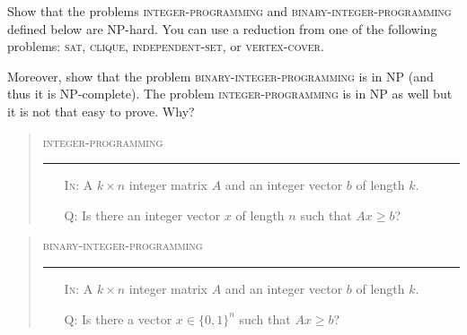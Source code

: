 \documentclass[a4paper,12pt]{amsart}
\begin{document}
        
        \medskip\begin{problem}
        Show that the problems \textsc{integer-programming} and \textsc{binary-integer-programming} defined below are NP-hard. You can use a reduction from one of the following problems: \textsc{sat}, \textsc{clique}, \textsc{independent-set}, or \textsc{vertex-cover}.
        
        Moreover, show that the problem \textsc{binary-integer-programming} is in NP (and thus it is NP-complete). The problem \textsc{integer-programming} is in NP as well but it is not that easy to prove. Why? 
        
        \bigskip
        \begin{quote}
        \begin{mdframed}
        \textsc{integer-programming}
        \medskip\hrule\medskip
        \begin{itemize}
            \item[\textsc{In:}] A $k\times n$ integer matrix $A$ and an integer vector $b$ of length $k$.
            \item[\textsc{Q:}] Is there an integer vector $x$ of length $n$ such that $Ax\geq b$?
        \end{itemize}
        \end{mdframed}
        \end{quote}
        
        \bigskip
        \begin{quote}
        \begin{mdframed}
        \textsc{binary-integer-programming}
        \medskip\hrule\medskip
        \begin{itemize}
            \item[\textsc{In:}] A $k\times n$ integer matrix $A$ and an integer vector $b$ of length $k$.
            \item[\textsc{Q:}] Is there a vector $x\in\{0,1\}^n$ such that $Ax\geq b$?
        \end{itemize}
        \end{mdframed}
        \end{quote}
        
        \end{problem}
        
\end{document}
